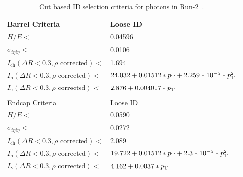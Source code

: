 \begin{table}[htb!]
	\centering
	\caption[Cut based ID selection criteria for photons in Run-2~\cite{photonid}.]{Cut based ID selection criteria for photons in Run-2~\cite{photonid}.}
	\label{tab:photonID}
	\begin{tabular}{l | l}
		\hline
		Barrel Criteria & Loose ID \\
		\hline
		\hline
		$H/E<$ & 0.04596\\
		$\sigma_{i\eta i\eta}<$ & 0.0106\\
		$I_\text{ch}(\Delta R<0.3,\rho\text{ corrected})<$ & 1.694\\
		$I_\text{n}(\Delta R<0.3,\rho\text{ corrected})<$ & $24.032+0.01512*p_{\mathrm{T}}+2.259*10^{-5}*p_{\mathrm{T}}^2$\\
		$I_\gamma(\Delta R<0.3,\rho\text{ corrected})<$ & $2.876+0.004017*p_{\mathrm{T}}$\\
		\hline
		\multicolumn{2}{l}{}\\
		\hline
		Endcap Criteria & Loose ID \\
		\hline
		\hline
		$H/E<$ & 0.0590\\
		$\sigma_{i\eta i\eta}<$ & 0.0272\\
		$I_\text{ch}(\Delta R<0.3,\rho\text{ corrected})<$ & 2.089\\
		$I_\text{n}(\Delta R<0.3,\rho\text{ corrected})<$ & $19.722+0.01512*p_{\mathrm{T}}+2.3*10^{-5}*p_{\mathrm{T}}^2$\\
		$I_\gamma(\Delta R<0.3,\rho\text{ corrected})<$ & $4.162+0.0037*p_{\mathrm{T}}$\\
		\hline
	\end{tabular}
\end{table}

